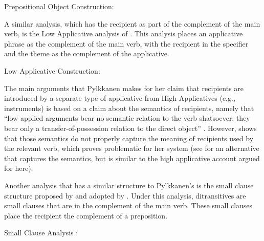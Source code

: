 \begin{exe}
\ex Prepositional Object Construction: \\
\end{exe}


A similar analysis, which has the recipient as part of the complement of the main verb, is the Low Applicative analysis of \cite{Pylkkanen.2001}. This analysis places an applicative phrase as the complement of the main verb, with the recipient in the specifier and the theme as the complement of the applicative. 
\begin{exe}
\ex Low Applicative Construction: \\
\end{exe}


The main arguments that Pylkkanen makes for her claim that recipients are introduced by a separate type of applicative from High Applicatives (e.g., instruments) is based on a claim about the semantics of recipients, namely that ``low applied arguments bear no semantic relation to the verb shatsoever; they bear only a transfer-of-possession relation to the direct object'' \citep{Pylkkanen.2008}. However, \cite{Larson.2010} shows that those semantics do not properly capture the meaning of recipients used by the relevant verb, which proves problematic for her system (see \citealt{Georgala.2012} for an alternative that captures the semantics, but is similar to the high applicative account argued for here).


Another analysis that has a similar structure to Pylkkanen's is the small clause structure proposed by \cite{DenDikken.1995} and adopted by \cite{Harley.2002,Harley.2015,Ormazabal.2012}. Under this analysis, ditransitives are small clauses that are in the complement of the main verb. These small clauses place the recipient the complement of a preposition.

\begin{exe}
	\ex Small Clause Analysis \citep[simplified from ex. 38]{DenDikken.1995}:\\
\end{exe}

